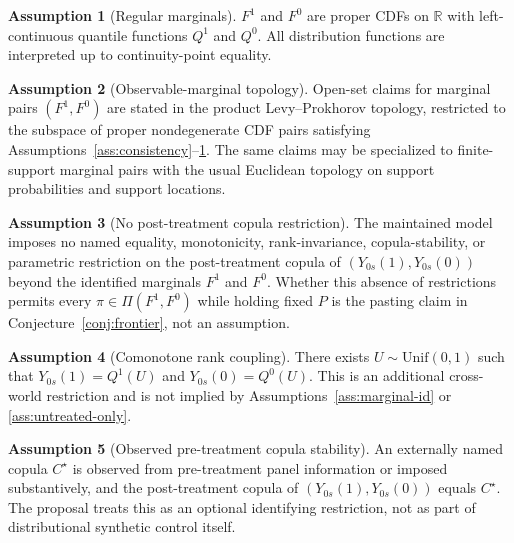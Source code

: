 \documentclass[11pt]{article}
\newcommand{\R}{\mathbb{R}}
\theoremstyle{definition}
\newtheorem{assumption}{Assumption}
\theoremstyle{plain}
\theoremstyle{remark}
\begin{document}
\begin{assumption}[Regular marginals]\label{ass:regular}
\(F^1\) and \(F^0\) are proper CDFs on \(\R\) with left-continuous quantile functions \(Q^1\) and \(Q^0\).  All distribution functions are interpreted up to continuity-point equality.
\end{assumption}

\begin{assumption}[Observable-marginal topology]\label{ass:topology}
Open-set claims for marginal pairs \((F^1,F^0)\) are stated in the product Levy--Prokhorov topology, restricted to the subspace of proper nondegenerate CDF pairs satisfying Assumptions~\ref{ass:consistency}--\ref{ass:regular}.  The same claims may be specialized to finite-support marginal pairs with the usual Euclidean topology on support probabilities and support locations.
\end{assumption}

\begin{assumption}[No post-treatment copula restriction]\label{ass:no-copula}
The maintained model imposes no named equality, monotonicity, rank-invariance, copula-stability, or parametric restriction on the post-treatment copula of \((Y_{0s}(1),Y_{0s}(0))\) beyond the identified marginals \(F^1\) and \(F^0\).  Whether this absence of restrictions permits every \(\pi\in\Pi(F^1,F^0)\) while holding fixed \(P\) is the pasting claim in Conjecture~\ref{conj:frontier}, not an assumption.
\end{assumption}

\begin{assumption}[Comonotone rank coupling]\label{ass:comonotone}
There exists \(U\sim\mathrm{Unif}(0,1)\) such that \(Y_{0s}(1)=Q^1(U)\) and \(Y_{0s}(0)=Q^0(U)\).  This is an additional cross-world restriction and is not implied by Assumptions~\ref{ass:marginal-id} or \ref{ass:untreated-only}.
\end{assumption}

\begin{assumption}[Observed pre-treatment copula stability]\label{ass:copula-stability}
An externally named copula \(C^\star\) is observed from pre-treatment panel information or imposed substantively, and the post-treatment copula of \((Y_{0s}(1),Y_{0s}(0))\) equals \(C^\star\).  The proposal treats this as an optional identifying restriction, not as part of distributional synthetic control itself.
\end{assumption}
\end{document}
